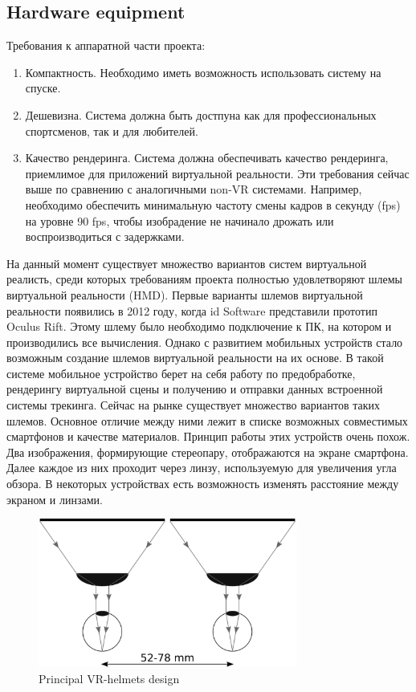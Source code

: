 \documentclass[twoside]{article}
\begin{document}
\subsection{Hardware equipment}
Требования к аппаратной части проекта:

\begin{enumerate}
	\item Компактность. Необходимо иметь возможность использовать систему на спуске.
	\item Дешевизна. Система должна быть достпуна как для профессиональных спортсменов, так и для любителей.
	\item Качество рендеринга. Система должна обеспечивать качество рендеринга, приемлимое для приложений виртуальной реальности.
		Эти требования сейчас выше по сравнению с аналогичными non-VR системами. Например, необходимо обеспечить 
		минимальную частоту смены кадров в секунду (fps) на уровне 90 fps, чтобы изобрадение не начинало дрожать или воспроизводиться с задержками.
\end{enumerate}

На данный момент существует множество вариантов систем виртуальной реалисть, среди которых требованиям проекта полностью удовлетворяют
шлемы виртуальной реальности (HMD).
Первые варианты шлемов виртуальной реальности появились в 2012 году, когда id Software представили прототип Oculus Rift.
Этому шлему было необходимо подключение к ПК, на котором и производились все вычисления.
Однако с развитием мобильных устройств стало возможным создание шлемов виртуальной реальности на их основе.
В такой системе мобильное устройство берет на себя работу по предобработке, рендерингу виртуальной сцены и получению и отправки данных
встроенной системы трекинга.
Сейчас на рынке существует множество вариантов таких шлемов.
Основное отличие между ними лежит в списке возможных совместимых смартфонов и качестве материалов.
Принцип работы этих устройств очень похож.
Два изображения, формирующие стереопару, отображаются на экране смартфона.
Далее каждое из них проходит через линзу, используемую для увеличения угла обзора.
В некоторых устройствах есть возможность изменять расстояние между экраном и линзами.

\begin{figure}[h]
	\centerline{\includegraphics[width=8.5cm]{helmet-scheme.eps}}
	\caption{Principal VR-helmets design}
	\label{figure:helmet-scheme}
\end{figure}
\end{document}
